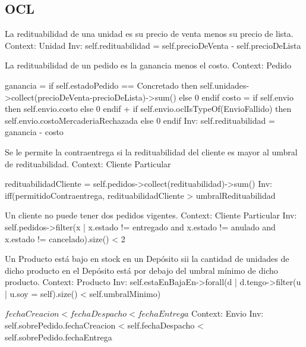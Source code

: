 \subsection{OCL}

\begin{listocl}
  \begin{itemocl}{La redituabilidad de una unidad es su precio de venta menos su precio de lista.}
Context: Unidad
Inv: self.redituabilidad = self.precioDeVenta - self.precioDeLista
  \end{itemocl}

  \begin{itemocl}{La redituabilidad de un pedido es la ganancia menos el costo.}
Context: Pedido

ganancia = if self.estadoPedido == Concretado
	   then self.unidades->collect(precioDeVenta-precioDeLista)->sum()
	   else 0
	   endif
costo = if self.envio
	then self.envio.costo
	else 0
	endif
	+ if self.envio.oclIsTypeOf(EnvioFallido)
	then self.envio.costoMercaderiaRechazada
	else 0
	endif
Inv: self.redituabilidad = ganancia - costo
  \end{itemocl}

  \begin{itemocl}{Se le permite la contraentrega si la redituabilidad del cliente es mayor al umbral de redituabilidad.}
Context: Cliente Particular

redituabilidadCliente = self.pedidos->collect(redituabilidad)->sum()
Inv: iff(permitidoContraentrega, redituabilidadCliente > umbralRedituabilidad

  \end{itemocl}

  \begin{itemocl}{Un cliente no puede tener dos pedidos vigentes.}
Context: Cliente Particular
Inv: self.pedidos->filter(x | x.estado != entregado and x.estado != anulado and x.estado != cancelado).size() < 2
  \end{itemocl}

  \begin{itemocl}{Un Producto está bajo en stock en un Depósito sii la cantidad de unidades de dicho producto en el Depósito está por debajo del umbral mínimo de dicho producto.}
Context: Producto
Inv: self.estaEnBajaEn->forall(d | d.tengo->filter(u | u.soy = self).size() < self.umbralMinimo)
  \end{itemocl}

  \begin{itemocl}{$fechaCreacion < fechaDespacho < fechaEntrega$}
Context: Envio
Inv: self.sobrePedido.fechaCreacion < self.fechaDespacho < self.sobrePedido.fechaEntrega
  \end{itemocl}


\end{listocl}
